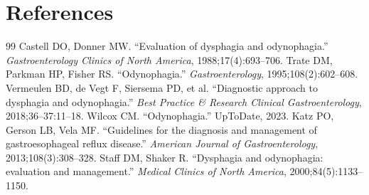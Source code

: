 \section*{References}
\begin{thebibliography}{99}
 Castell DO, Donner MW. ``Evaluation of dysphagia and odynophagia.'' \textit{Gastroenterology Clinics of North America}, 1988;17(4):693--706.
 Trate DM, Parkman HP, Fisher RS. ``Odynophagia.'' \textit{Gastroenterology}, 1995;108(2):602--608.
 Vermeulen BD, de Vegt F, Siersema PD, et al. ``Diagnostic approach to dysphagia and odynophagia.'' \textit{Best Practice \& Research Clinical Gastroenterology}, 2018;36--37:11--18.
 Wilcox CM. ``Odynophagia.'' UpToDate, 2023.
 Katz PO, Gerson LB, Vela MF. ``Guidelines for the diagnosis and management of gastroesophageal reflux disease.'' \textit{American Journal of Gastroenterology}, 2013;108(3):308--328.
 Staff DM, Shaker R. ``Dysphagia and odynophagia: evaluation and management.'' \textit{Medical Clinics of North America}, 2000;84(5):1133--1150.

\end{thebibliography}
